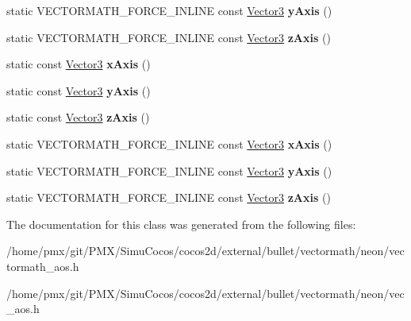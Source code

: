 \begin{DoxyCompactItemize}
static V\+E\+C\+T\+O\+R\+M\+A\+T\+H\+\_\+\+F\+O\+R\+C\+E\+\_\+\+I\+N\+L\+I\+NE const \hyperlink{classVectormath_1_1Aos_1_1Vector3}{Vector3} {\bfseries y\+Axis} ()
\item 
\mbox{\label{classVectormath_1_1Aos_1_1Vector3_a010a3e78e88c05641adb6916352297cb}} 
static V\+E\+C\+T\+O\+R\+M\+A\+T\+H\+\_\+\+F\+O\+R\+C\+E\+\_\+\+I\+N\+L\+I\+NE const \hyperlink{classVectormath_1_1Aos_1_1Vector3}{Vector3} {\bfseries z\+Axis} ()
\item 
\mbox{\label{classVectormath_1_1Aos_1_1Vector3_adb14735bfe8dfe9a47d40101df2d6bac}} 
static const \hyperlink{classVectormath_1_1Aos_1_1Vector3}{Vector3} {\bfseries x\+Axis} ()
\item 
\mbox{\label{classVectormath_1_1Aos_1_1Vector3_a294d0afafac74a08da052b0634933c8d}} 
static const \hyperlink{classVectormath_1_1Aos_1_1Vector3}{Vector3} {\bfseries y\+Axis} ()
\item 
\mbox{\label{classVectormath_1_1Aos_1_1Vector3_adb1dcbe829b75d5a1b6e57e7dc283394}} 
static const \hyperlink{classVectormath_1_1Aos_1_1Vector3}{Vector3} {\bfseries z\+Axis} ()
\item 
\mbox{\label{classVectormath_1_1Aos_1_1Vector3_ad0e9d557df8c430a702cc2358c6f7014}} 
static V\+E\+C\+T\+O\+R\+M\+A\+T\+H\+\_\+\+F\+O\+R\+C\+E\+\_\+\+I\+N\+L\+I\+NE const \hyperlink{classVectormath_1_1Aos_1_1Vector3}{Vector3} {\bfseries x\+Axis} ()
\item 
\mbox{\label{classVectormath_1_1Aos_1_1Vector3_a09dcdf16938b37751a0a8df7f31e6b72}} 
static V\+E\+C\+T\+O\+R\+M\+A\+T\+H\+\_\+\+F\+O\+R\+C\+E\+\_\+\+I\+N\+L\+I\+NE const \hyperlink{classVectormath_1_1Aos_1_1Vector3}{Vector3} {\bfseries y\+Axis} ()
\item 
\mbox{\label{classVectormath_1_1Aos_1_1Vector3_a010a3e78e88c05641adb6916352297cb}} 
static V\+E\+C\+T\+O\+R\+M\+A\+T\+H\+\_\+\+F\+O\+R\+C\+E\+\_\+\+I\+N\+L\+I\+NE const \hyperlink{classVectormath_1_1Aos_1_1Vector3}{Vector3} {\bfseries z\+Axis} ()
\end{DoxyCompactItemize}


The documentation for this class was generated from the following files\+:\begin{DoxyCompactItemize}
\item 
/home/pmx/git/\+P\+M\+X/\+Simu\+Cocos/cocos2d/external/bullet/vectormath/neon/vectormath\+\_\+aos.\+h\item 
/home/pmx/git/\+P\+M\+X/\+Simu\+Cocos/cocos2d/external/bullet/vectormath/neon/vec\+\_\+aos.\+h\end{DoxyCompactItemize}
